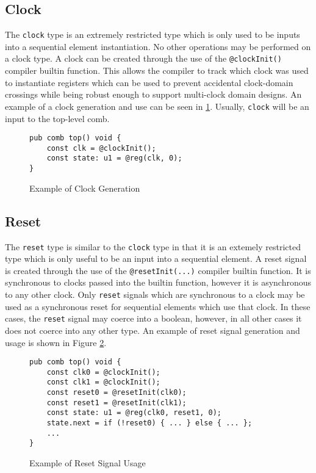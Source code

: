 \documentclass[10pt]{article}
\begin{document}
\subsection{Clock}
The \verb|clock| type is an extremely restricted type which is only used to be inputs into
a sequential element instantiation. No other operations may be performed on a clock type. A clock
can be created through the use of the \verb|@clockInit()| compiler builtin function. This allows
the compiler to track which clock was used to instantiate registers which can be used to prevent
accidental clock-domain crossings while being robust enough to support multi-clock domain designs.
An example of a clock generation and use can be seen in \ref{fig:clock_example}. Usually,
\verb|clock| will be an input to the top-level comb.
\begin{figure}[H]
	\begin{verbatim}
pub comb top() void {
    const clk = @clockInit();
    const state: u1 = @reg(clk, 0);
}
    \end{verbatim}
	\vspace*{-10mm}
	\caption{Example of Clock Generation}
	\label{fig:clock_example}
\end{figure}

\subsection{Reset}
The \verb|reset| type is similar to the \verb|clock| type in that it is an extemely restricted type
which is only useful to be an input into a sequential element. A reset signal is created through the
use of the \verb|@resetInit(...)| compiler builtin function. It is synchronous to clocks passed into
the builtin function, however it is asynchronous to any other clock. Only \verb|reset| signals which
are synchronous to a clock may be used as a synchronous reset for sequential elements which use that
clock. In these cases, the \verb|reset| signal may coerce into a boolean, however, in all other
cases it does not coerce into any other type. An example of reset signal generation and usage is
shown in Figure \ref{fig:reset_example}.
\begin{figure}[H]
	\begin{verbatim}
pub comb top() void {
    const clk0 = @clockInit();
    const clk1 = @clockInit();
    const reset0 = @resetInit(clk0);
    const reset1 = @resetInit(clk1);
    const state: u1 = @reg(clk0, reset1, 0);
    state.next = if (!reset0) { ... } else { ... };
    ...
}
    \end{verbatim}
	\vspace*{-10mm}
	\caption{Example of Reset Signal Usage}
	\label{fig:reset_example}
\end{figure}
\end{document}
